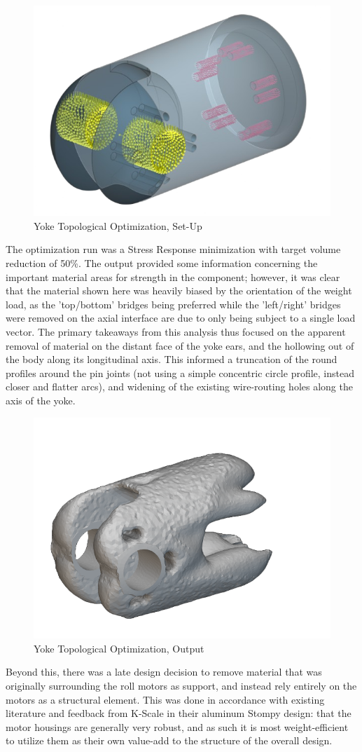 \documentclass{article}
\begin{document}
\begin{figure}
    \centering
    \includegraphics[width=0.5\linewidth]{assets/MOHRA/Sub-Arm/Ntop_Loads_tp.png}
    \caption{Yoke Topological Optimization, Set-Up}
    \label{fig:enter-label}
\end{figure}

The optimization run was a Stress Response minimization with target volume reduction of 50\%. The output provided some information concerning the important material areas for strength in the component; however, it was clear that the material shown here was heavily biased by the orientation of the weight load, as the 'top/bottom' bridges being preferred while the 'left/right' bridges were removed on the axial interface are due to only being subject to a single load vector. The primary takeaways from this analysis thus focused on the apparent removal of material on the distant face of the yoke ears, and the hollowing out of the body along its longitudinal axis. This informed a truncation of the round profiles around the pin joints (not using a simple concentric circle profile, instead closer and flatter arcs), and widening of the existing wire-routing holes along the axis of the yoke. 

\begin{figure}
    \centering
    \includegraphics[width=0.5\linewidth]{assets/MOHRA/Sub-Arm/Ntop_TopOpt.png}
    \caption{Yoke Topological Optimization, Output}
    \label{fig:enter-label}
\end{figure}

Beyond this, there was a late design decision to remove material that was originally surrounding the roll motors as support, and instead rely entirely on the motors as a structural element. This was done in accordance with existing literature and feedback from K-Scale in their aluminum Stompy design: that the motor housings are generally very robust, and as such it is most weight-efficient to utilize them as their own value-add to the structure of the overall design.
\end{document}
